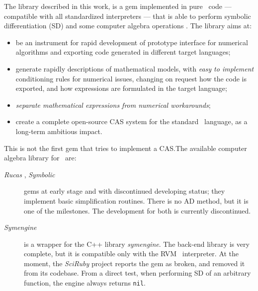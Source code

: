 The library described in this work, is a gem implemented in pure \Ruby~code --- compatible with all standardized interpreters --- that is able to perform symbolic differentiation (SD) and some computer algebra operations \cite{von2013modern}. The library aims at:
\begin{itemize}
  \item be an instrument for rapid development of prototype interface for numerical algorithms and exporting code generated in different target languages;
  \item generate rapidly descriptions of mathematical models, with \emph{easy to implement} conditioning rules for numerical issues, changing on request how the code is exported, and how expressions are formulated in the target language;
  \item \emph{separate mathematical expressions from numerical workarounds};
  \item create a complete open-source CAS system for the standard \Ruby~language, as a long-term ambitious impact.
\end{itemize}

This is not the first gem that tries to implement a CAS.\@ The available computer algebra library for \Ruby~are:
\begin{description}
  \item [\emph{Rucas} \cite{rucas}, \emph{Symbolic} \cite{symbolic}] gems at early stage and with discontinued developing status; they implement basic simplification routines. There is no AD method, but it is one of the milestones. The development for both is currently discontinued.
  \item [\emph{Symengine} \cite{symengine}] is a wrapper for the C++ library \emph{symengine}. The back-end library is very complete, but it is compatible only with the RVM \Ruby~interpreter. At the moment, the \emph{SciRuby} project reports the gem as broken, and removed it from its codebase. From a direct test, when performing SD of an arbitrary function, the engine always returns \texttt{nil}.
\end{description}
